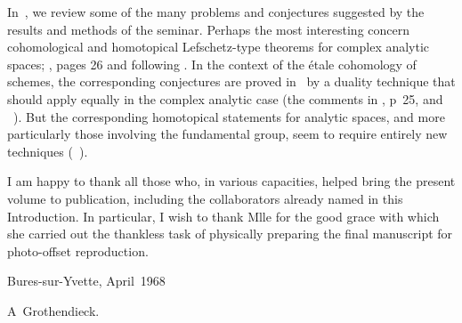 In~, we review some of the many problems and conjectures
suggested by the results and methods of the seminar. Perhaps the most
interesting concern cohomological and homotopical Lefschetz-type theorems
for complex analytic spaces; \cf {}, pages 26 and following
. In the context of the \'etale cohomology of
schemes\pageoriginale, the corresponding conjectures are proved
in~ by a duality technique that should apply equally in the
complex analytic case (\cf the comments in , p\ptbl~25, and
~). But the corresponding homotopical statements
for analytic spaces, and more particularly those involving the
fundamental group, seem to require entirely new techniques
(\cf {}~).

I am happy to thank all those who, in various capacities, helped bring the
present volume to publication, including the collaborators already named
in this Introduction. In particular, I wish to thank Mlle
 for the good grace with which she carried out the
thankless task of physically preparing the final manuscript for
photo-offset reproduction.

\bigskip\hfill Bures-sur-Yvette, April~1968
\par\smallskip \hfill A\ptbl~Grothendieck.
